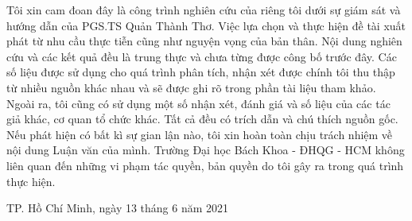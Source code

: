 \documentclass[12pt,a4paper,oneside]{book} %
\begin{document}
\begin{declaration}

Tôi xin cam đoan đây là công trình nghiên cứu của riêng tôi dưới sự giám sát và hướng dẫn của PGS.TS Quản Thành Thơ. Việc lựa chọn và thực hiện đề tài xuất phát từ nhu cầu thực tiễn cũng như nguyện vọng của bản thân. Nội dung nghiên cứu và các kết quả đều là trung thực và chưa từng được công bố trước đây. Các số liệu được sử dụng cho quá trình phân tích, nhận xét được chính tôi thu thập từ nhiều nguồn khác nhau và sẽ được ghi rõ trong phần tài liệu tham khảo.\\

Ngoài ra, tôi cũng có sử dụng một số nhận xét, đánh giá và số liệu của các tác giả khác, cơ quan tổ chức khác. Tất cả đều có trích dẫn và chú thích nguồn gốc.\\

Nếu phát hiện có bất kì sự gian lận nào, tôi xin hoàn toàn chịu trách nhiệm về nội dung Luận văn của mình. Trường Đại học Bách Khoa - ĐHQG - HCM không liên quan đến những vi phạm tác quyền, bản quyền do tôi gây ra trong quá trình thực hiện.

\begin{flushright}
TP. Hồ Chí Minh, ngày 13 tháng 6 năm 2021
\end{flushright}
{\hspace*{9.8cm}{Sinh viên thực hiện}}
\\
\\
\\
\\
{\hspace*{9.9cm}{Hồ Phương Ngọc}}
\end{declaration}

\tableofcontents

\listoftables
\listoffigures

\mainmatter

\fancyhead{}  %
\renewcommand{\footrulewidth}{0.4pt}
\renewcommand{\headrulewidth}{0.4pt}

\pagestyle{fancy}  %





% 







\cvpage
\end{document}
